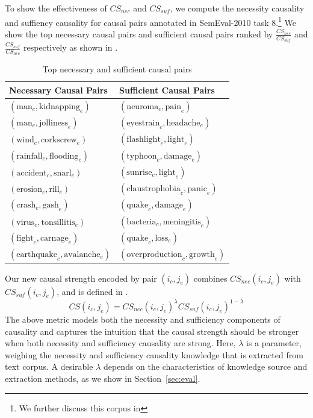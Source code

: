 To show the effectiveness of $CS_{nec}$ and $CS_{suf}$,
we compute the necessity causality and suffiency causality
for causal pairs annotated in SemEval-2010 task 8.\footnote{We further
discuss this corpus in }
We show the top necessary causal pairs and sufficient causal
pairs ranked by $\frac{CS_{nec}}{CS_{suf}}$ and $\frac{CS_{suf}}{CS_{nec}}$
respectively as shown in .
\begin{table}[th]
\caption{Top necessary and sufficient causal pairs}
\label{tab:necsuf}
\begin{tabular}{l|l}
Necessary Causal Pairs & Sufficient Causal Pairs \\
\hline \hline
$(\text{man}_c, \text{kidnapping}_e)$ & $(\text{neuroma}_c, \text{pain}_e)$ \\
$(\text{man}_c, \text{jolliness}_e)$ & $(\text{eyestrain}_c, \text{headache}_e)$ \\
$(\text{wind}_c, \text{corkscrew}_e)$ & $(\text{flashlight}_c, \text{light}_e)$ \\
$(\text{rainfall}_c, \text{flooding}_e)$ & $(\text{typhoon}_c, \text{damage}_e)$ \\
$(\text{accident}_c, \text{snarl}_e)$ & $(\text{sunrise}_c, \text{light}_e)$ \\
$(\text{erosion}_c, \text{rill}_e)$ & $(\text{claustrophobia}_c, \text{panic}_e)$ \\
$(\text{crash}_c, \text{gash}_e)$ & $(\text{quake}_c, \text{damage}_e)$\\
$(\text{virus}_c, \text{tonsillitis}_e)$ & $(\text{bacteria}_c, \text{meningitis}_e)$  \\
$(\text{fight}_c, \text{carnage}_e)$ & $(\text{quake}_c, \text{loss}_e)$ \\
$(\text{earthquake}_c, \text{avalanche}_e)$ & $(\text{overproduction}_c, \text{growth}_e)$ \\
\hline
\end{tabular}
\end{table}

Our new causal strength encoded by pair $(i_c,j_e)$ combines
$CS_{nec}(i_c,j_e)$ with $CS_{suf}(i_c,j_e)$,
and is defined in .
\begin{equation}
CS(i_c,j_e) = CS_{nec}(i_c,j_e)^{\lambda} CS_{suf}(i_c,j_e)^{1-\lambda}
\label{eq:weightedcs}
\end{equation}
The above metric models both the necessity and sufficiency components
of causality and captures the intuition that
the causal strength should be stronger when both necessity and sufficiency
causality are strong.
Here, $\lambda$ is a parameter, weighing the necessity and sufficiency
causality knowledge that is extracted from text corpus.
A desirable $\lambda$ depends on the characteristics of knowledge
source and extraction methods, as we show in Section~\ref{sec:eval}.

